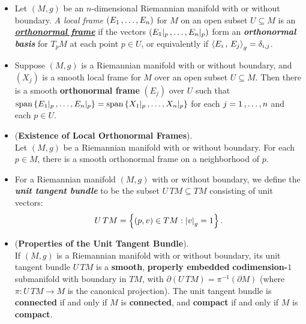 \documentclass[11pt]{article}
\begin{document}
\begin{itemize}
\item \begin{definition}
Let $(M, g)$ be an $n$-dimensional Riemannian manifold with or without boundary. \emph{A local frame} $(E_1 \,{,}\ldots{,}\, E_n)$ for $M$ on an open subset $U \subseteq M$ is an \underline{\emph{\textbf{orthonormal frame}}} if the vectors $(E_1|_{p} \,{,}\ldots{,}\, E_n|_{p})$ form an \emph{\textbf{orthonormal basis}} for $T_{p}M$ at each point $p \in U$, or
equivalently if $\left\langle E_i\,,\, E_j \right\rangle_g = \delta_{i,j}$.
\end{definition}

\item \begin{proposition}
Suppose $(M, g)$ is a Riemannian manifold with or without boundary, and $(X_j)$ is a smooth local frame for $M$ over an open subset $U \subseteq M$. Then there is a smooth \textbf{orthonormal frame} $(E_j)$ over $U$ such that $\text{span}\left\{E_1|_{p} \,{,}\ldots{,}\, E_n|_{p}\right\}=\text{span}\left\{X_1|_{p} \,{,}\ldots{,}\, X_n|_{p}\right\}$ for each $j = 1\,{,}\ldots{,}\, n$ and each $p \in U$.
\end{proposition}

\item \begin{corollary} (\textbf{Existence of Local Orthonormal Frames}).\\
Let $(M, g)$ be a Riemannian manifold with or without boundary. For each $p \in M$, there is a smooth orthonormal frame on a neighborhood of $p$.
\end{corollary}

\item \begin{definition}
For a Riemannian manifold $(M, g)$ with or without boundary, we define the \emph{\textbf{unit tangent bundle}} to be the subset $U\,TM \subseteq TM$ consisting of unit vectors:
\begin{align*}
U\,TM = \left\{(p,v) \in TM: \left\lvert v \right\rvert_g = 1\right\}.
\end{align*}
\end{definition}

\item \begin{proposition}(\textbf{Properties of the Unit Tangent Bundle}). \citep{lee2018introduction}\\
If $(M, g)$ is a Riemannian manifold with or without boundary, its unit tangent bundle $U\,TM$ is a \textbf{smooth}, \textbf{properly embedded} \textbf{codimension-$1$} submanifold with boundary in $TM$, with $\partial(U\,TM) = \pi^{-1}(\partial M)$ (where  $\pi: U\,TM \rightarrow M$ is the canonical projection). The unit
tangent bundle is \textbf{connected} if and only if $M$ is \textbf{connected}, and \textbf{compact} if and only if $M$ is \textbf{compact}.
\end{proposition}
\end{itemize}
\end{document}
